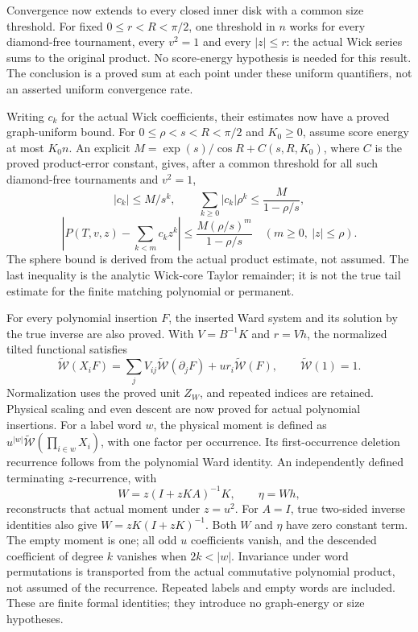 \documentclass[11pt]{article}
\begin{document}
Convergence now extends to every closed inner disk with a common size threshold. For fixed $0\le r<R<\pi/2$, one threshold in $n$ works for every diamond-free tournament, every $v^2=1$ and every $|z|\le r$: the actual Wick series sums to the original product. No score-energy hypothesis is needed for this result. The conclusion is a proved sum at each point under these uniform quantifiers, not an asserted uniform convergence rate.

Writing $c_k$ for the actual Wick coefficients, their estimates now have a proved graph-uniform bound. For $0\le\rho<s<R<\pi/2$ and $K_0\ge0$, assume score energy at most $K_0n$. An explicit $M=\exp(s)/\cos R+C(s,R,K_0)$, where $C$ is the proved product-error constant, gives, after a common threshold for all such diamond-free tournaments and $v^2=1$,
\[
 |c_k|\le M/s^k,\qquad \sum_{k\ge0}|c_k|\rho^k\le\frac{M}{1-\rho/s},
\]
\[
 \left|P(T,v,z)-\sum_{k<m}c_kz^k\right|
 \le\frac{M(\rho/s)^m}{1-\rho/s}\quad(m\ge0,\ |z|\le\rho).
\]
The sphere bound is derived from the actual product estimate, not assumed. The last inequality is the analytic Wick-core Taylor remainder; it is not the true tail estimate for the finite matching polynomial or permanent.

For every polynomial insertion $F$, the inserted Ward system and its solution by the true inverse are also proved. With $V=B^{-1}K$ and $r=Vh$, the normalized tilted functional satisfies
\[
 \widetilde{\mathcal W}(X_iF)
 =\sum_jV_{ij}\widetilde{\mathcal W}(\partial_jF)
   +u r_i\widetilde{\mathcal W}(F),\qquad
 \widetilde{\mathcal W}(1)=1.
\]
Normalization uses the proved unit $Z_W$, and repeated indices are retained. Physical scaling and even descent are now proved for actual polynomial insertions. For a label word $w$, the physical moment is defined as $u^{|w|}\widetilde{\mathcal W}(\prod_{i\in w}X_i)$, with one factor per occurrence. Its first-occurrence deletion recurrence follows from the polynomial Ward identity. An independently defined terminating $z$-recurrence, with
\[
 W=z(I+zKA)^{-1}K,\qquad \eta=Wh,
\]
reconstructs that actual moment under $z=u^2$. For $A=I$, true two-sided inverse identities also give $W=zK(I+zK)^{-1}$. Both $W$ and $\eta$ have zero constant term. The empty moment is one; all odd $u$ coefficients vanish, and the descended coefficient of degree $k$ vanishes when $2k<|w|$. Invariance under word permutations is transported from the actual commutative polynomial product, not assumed of the recurrence. Repeated labels and empty words are included. These are finite formal identities; they introduce no graph-energy or size hypotheses.
\end{document}
